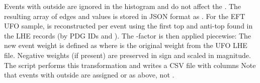 {}Events with  outside  are ignored in the histogram and do not affect the .\markdownRendererParagraphSeparator
{}The resulting array of edges  and values  is stored in JSON format as .\markdownRendererInterblockSeparator
{}
\markdownRendererSectionEnd \markdownRendererSectionBegin
{}\markdownRendererInterblockSeparator
{}For the EFT UFO sample,  is reconstructed per event using the first top and anti-top found in the LHE records (by PDG IDs  and ). The -factor is then applied piecewise:\markdownRendererParagraphSeparator
{}\markdownRendererParagraphSeparator
{}The new event weight is defined as\markdownRendererParagraphSeparator
{}\markdownRendererParagraphSeparator
{}where  is the original weight from the UFO LHE file. Negative weights (if present) are preserved in sign and scaled in magnitude.\markdownRendererParagraphSeparator
{}The script  performs this transformation and writes a CSV file  with columns\markdownRendererParagraphSeparator
{}\markdownRendererParagraphSeparator
{}Note that events with  outside  are assigned  or  as above, not .\markdownRendererInterblockSeparator

